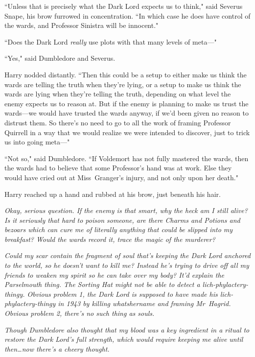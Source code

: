 ``Unless that is precisely what the Dark Lord expects us to think," said Severus Snape, his brow furrowed in concentration. ``In which case he does have control of the wards, and Professor Sinistra will be innocent."

``Does the Dark Lord \emph{really} use plots with that many levels of meta—"

``Yes," said Dumbledore and Severus.

Harry nodded distantly. ``Then this could be a setup to either make us think the wards are telling the truth when they're lying, or a setup to make us think the wards are lying when they're telling the truth, depending on what level the enemy expects us to reason at. But if the enemy is planning to make us trust the wards—we would have trusted the wards anyway, if we'd been given no reason to distrust them. So there's no need to go to all the work of framing Professor Quirrell in a way that we would realize we were intended to discover, just to trick us into going meta—"

``Not so," said Dumbledore. ``If Voldemort has not fully mastered the wards, then the wards had to believe that some Professor's hand was at work. Else they would have cried out at Miss~Granger's injury, and not only upon her death."

Harry reached up a hand and rubbed at his brow, just beneath his hair.

\emph{Okay, serious question. If the enemy is that smart, why the heck am I still alive? Is it seriously that hard to poison someone, are there Charms and Potions and bezoars which can cure me of literally anything that could be slipped into my breakfast? Would the wards record it, trace the magic of the murderer?}

\emph{Could my \emph{scar} contain the fragment of soul that's keeping the Dark Lord anchored to the world, so he doesn't want to kill me? Instead he's trying to drive off all my friends to weaken my spirit so he can take over my body? It'd explain the Parselmouth thing. The Sorting Hat might not be able to detect a lich-phylactery-thingy. Obvious problem 1, the Dark Lord is supposed to have made his lich-phylactery-thingy in 1943 by killing whatshername and framing Mr~Hagrid. Obvious problem 2, there's no such thing as souls.}

\emph{Though Dumbledore also thought that my blood was a key ingredient in a ritual to restore the Dark Lord's full strength, which would require keeping me alive until then…now there's a cheery thought.}

